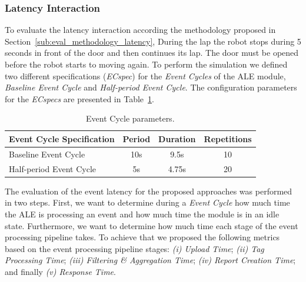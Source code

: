 \subsubsection{Latency Interaction}
\label{subs:eval_exp_latency}
To evaluate the latency interaction according the methodology proposed in Section~\ref{sub:eval_methodology_latency},
During the lap the robot stops during 5 seconds in front of the door and then continues its lap.
The door must be opened before the robot starts to moving again. To perform the simulation we defined
two different specifications (\textit{ECspec}) for the \textit{Event Cycles} of the \gls{ALE} module,
\textit{Baseline Event Cycle} and \textit{Half-period Event Cycle}. The configuration parameters
for the \textit{ECspecs} are presented in Table~\ref{table:ecspec_parameters}.

\begin{table}[ht!]
 \begin{tabular}{|l|c|c|c|}
  \hline
  Event Cycle Specification & Period  & Duration & Repetitions \\ \hline
  Baseline Event Cycle      &  10s    & 9.5s     & 10          \\ \hline
  Half-period Event Cycle   &   5s    & 4.75s    & 20          \\ \hline
 \end{tabular}
 \caption[Event Cycle parameters.]{Event Cycle parameters.}
 \label{table:ecspec_parameters}
\end{table}

The evaluation of the event latency for the proposed approaches was performed in two steps. First,
we want to determine during a \textit{Event Cycle} how much time the \gls{ALE} is processing an event
and how much time the module is in an idle state. Furthermore, we want to determine how much time
each stage of the event processing pipeline takes. To achieve that we proposed the following metrics
based on the event processing pipeline stages: \textit{(i) Upload Time}; \textit{(ii) Tag Processing Time};
\textit{(iii) Filtering \& Aggregation Time}; \textit{(iv) Report Creation Time};
and finally \textit{(v) Response Time}.\\

